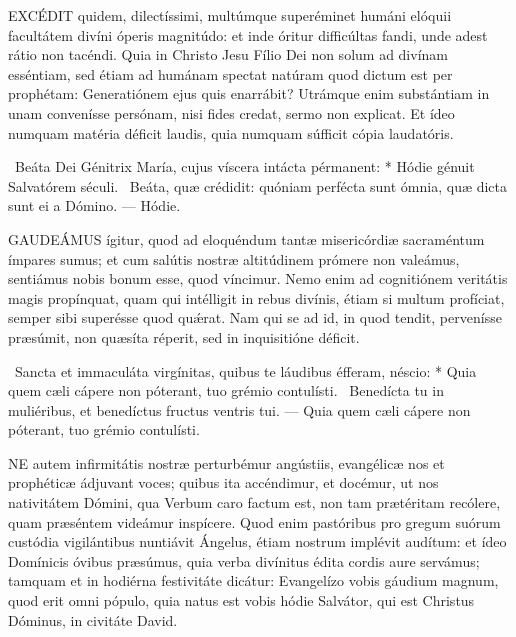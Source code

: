 






\lettrine[lines=2]{E}{XCÉDIT} quidem, dilectíssimi, multúmque superéminet humáni elóquii facultátem divíni óperis magnitúdo: et inde óritur difficúltas fandi, unde adest rátio non tacéndi. Quia in Christo Jesu Fílio Dei non solum ad divínam esséntiam, sed étiam ad humánam spectat natúram quod dictum est per prophétam: Generatiónem ejus quis enarrábit? Utrámque enim substántiam in unam convenísse persónam, nisi fides credat, sermo non explicat. Et ídeo numquam matéria déficit laudis, quia numquam súfficit cópia laudatóris.

\R\ Beáta Dei Génitrix María, cujus víscera intácta pérmanent: * Hódie génuit Salvatórem séculi. \V\ Beáta, quæ crédidit: quóniam perfécta sunt ómnia, quæ dicta sunt ei a Dómino. --- Hódie.


\lettrine[lines=2]{G}{AUDEÁMUS} ígitur, quod ad eloquéndum tantæ misericórdiæ sacraméntum ímpares sumus; et cum salútis nostræ altitúdinem prómere non valeámus, sentiámus nobis bonum esse, quod víncimur. Nemo enim ad cognitiónem veritátis magis propínquat, quam qui intélligit in rebus divínis, étiam si multum profíciat, semper sibi superésse quod quǽrat. Nam qui se ad id, in quod tendit, pervenísse præsúmit, non quæsíta réperit, sed in inquisitióne déficit.

\R\ Sancta et immaculáta virgínitas, quibus te láudibus éfferam, néscio: * Quia quem cæli cápere non póterant, tuo grémio contulísti. \V\ Benedícta tu in muliéribus, et benedíctus fructus ventris tui. --- Quia quem cæli cápere non póterant, tuo grémio contulísti.


\lettrine[lines=2]{N}{E} autem infirmitátis nostræ perturbémur angústiis, evangélicæ nos et prophéticæ ádjuvant voces; quibus ita accéndimur, et docémur, ut nos nativitátem Dómini, qua Verbum caro factum est, non tam prætéritam recólere, quam præséntem videámur inspícere. Quod enim pastóribus pro gregum suórum custódia vigilántibus nuntiávit Ángelus, étiam nostrum implévit audítum: et ídeo Domínicis óvibus præsúmus, quia verba divínitus édita cordis aure servámus; tamquam et in hodiérna festivitáte dicátur: Evangelízo vobis gáudium magnum, quod erit omni pópulo, quia natus est vobis hódie Salvátor, qui est Christus Dóminus, in civitáte David.

